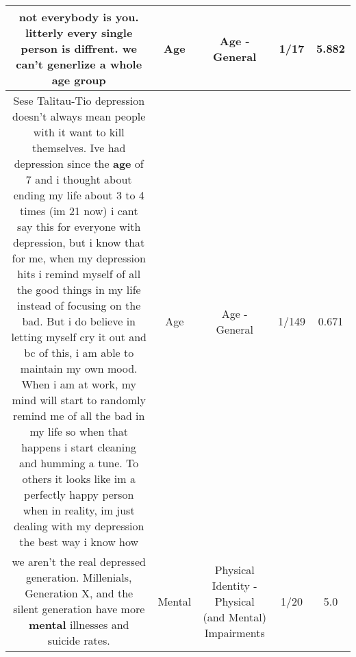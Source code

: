 \documentclass[11pt]{article}
\newlength\mylength
\begin{document}
\begin{center}
\begin{longtable}{|C{.65\mylength}|C{.30\mylength}|C{.12\mylength}|C{.12\mylength}|C{.12\mylength}|}
  \small not everybody is you. litterly every single person is diffrent. we can't generlize a whole \textbf{age} group\normalsize   & Age & Age - General & 1/17 & 5.882 \\  \hline
  \small Sese Talitau-Tio depression doesn't always mean people with it want to kill themselves. Ive had depression since the \textbf{age} of 7 and i thought about ending my life about 3 to 4 times (im 21 now) i cant say this for everyone with depression, but i know that for me, when my depression hits i remind myself of all the good things in my life instead of focusing on the bad. But i do believe in letting myself cry it out and bc of this, i am able to maintain my own mood. When i am at work, my mind will start to randomly remind me of all the bad in my life so when that happens i start cleaning and humming a tune. To others it looks like im a perfectly happy person when in reality, im just dealing with my depression the best way i know how\normalsize   & Age & Age - General & 1/149 & 0.671 \\  \hline
  \small we aren't the real depressed generation. Millenials, Generation X, and the silent generation have more \textbf{mental} illnesses and suicide rates.\normalsize   & Mental & Physical Identity - Physical (and Mental) Impairments & 1/20 & 5.0 \\  \hline

\end{longtable}
\end{center}
\end{document}
